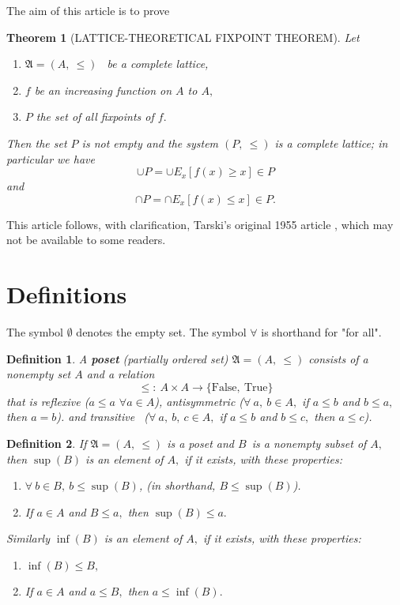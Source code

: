 \documentclass[12pt]{article}
\newtheorem{definition}{Definition}
\newtheorem{theorem}{Theorem}
\numberwithin{equation}{section}
\begin{document}
The aim of this article is to prove
\begin{theorem}
[LATTICE-THEORETICAL FIXPOINT THEOREM]Let

\begin{enumerate}
\item[(i)] $\mathfrak{A}=(A,\ \leq)$ \ be a complete lattice,

\item[(ii)] $f$ be an increasing function on $A$ to $A,$

\item[(iii)] $P$ the set of all fixpoints of $f.$
\end{enumerate}

Then the set $P$ is not empty and the system $(P,\ \leq)$ is a complete
lattice; in particular we have
\[
\cup P=\cup E_{x}[f(x)\geq x]\in P
\]
and
\[
\cap P=\cap E_{x}[f(x)\leq x]\in P.
\]

\end{theorem}

This article follows, with clarification, Tarski's original
1955 article \cite{tarski}, which may not be available to some readers.

\section{Definitions}

The symbol $\emptyset$ denotes the empty set. The symbol $\forall$ is
shorthand for "for all".

\begin{definition}
A \textbf{poset} (partially ordered set) $\mathfrak{A}=(A,\ \leq)$ consists of
a nonempty set $A$ and a relation
\[
\leq:\ A\times A\longrightarrow\{\text{False},\ \text{True}\}
\]
that is reflexive ($a\leq a$ $\forall a\in A$), antisymmetric ($\forall
\ a,\ b\in A,$ if $a\leq b$ and $b\leq a,$ then $a=b$). and transitive
\ ($\forall\ a,\ b,\ c\in A,$ if $a\leq b$ and $b\leq c,$ then $a\leq c$).
\end{definition}

\begin{definition}
If $\mathfrak{A}=(A,\ \leq)$ is a poset and $B$\ is a nonempty subset of $A,$
then $\sup(B)$ is an element of $A,$ if it exists, with these properties:

\begin{enumerate}
\item $\forall\ b\in B,~b\leq\sup(B)$, (in shorthand, $B\leq\sup(B)$).

\item If $a\in A$ and $B\leq a,$ then $\sup(B)\leq a.$
\end{enumerate}

Similarly $\inf(B)$ is an element of $A,$ if it exists, with these properties:

\begin{enumerate}
\item[(3)] $\inf(B)\leq B,$

\item[(4)] If $a\in A$ and $a\leq B,$ then $a\leq\inf(B).$
\end{enumerate}
\end{definition}
\end{document}
